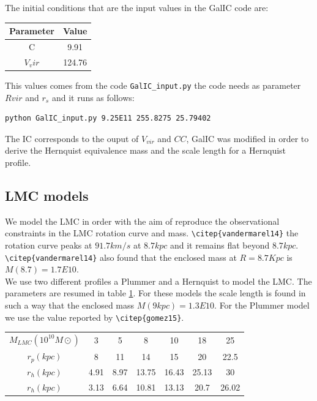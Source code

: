 The initial conditions that are the input values in the GalIC code are:

\begin{table}
\begin{tabular}{c c}
\hline
Parameter & Value \\
\hline
C & 9.91 \\
$V_vir$ & 124.76\\
\end{tabular}
\end{table}

This values comes from the code \verb+GalIC_input.py+ the code needs 
as parameter $Rvir$ and $r_s$ and it runs as follows:

\begin{verbatim}
python GalIC_input.py 9.25E11 255.8275 25.79402
\end{verbatim}

The IC corresponds to the ouput of $V_{vir}$ and $CC$, GalIC was modified 
in order to derive the Hernquist equivalence mass and the scale length for a
Hernquist profile.


\subsection{LMC models}

We model the LMC in order with the aim of reproduce the observational 
constraints in the LMC rotation curve and mass. \verb+\citep{vandermarel14}+
the rotation curve peaks at $91.7 km/s$ at $8.7 kpc$ and it remains flat 
beyond $8.7 kpc$. \verb+\citep{vandermarel14}+ also found that the enclosed
mass at $R = 8.7Kpc$ is $M(8.7) = 1.7E10$.\\

We use two different profiles a Plummer and a Hernquist to model the 
LMC. The parameters are resumed in table \ref{tab:LMC}. For these 
models the scale length is found in such a way that the enclosed 
mass  $M(9kpc) = 1.3E10$. For the Plummer model we use the value
reported by \verb+\citep{gomez15}+.



\begin{table}[H]{\label{tab:LMC}}
\begin{center}
\begin{tabular}{c c c c c c c}
\hline
\hline
$M_{LMC} (10^10M\odot)$ & 3 & 5 & 8 & 10 & 18 & 25 \\
$r_p(kpc)$ & 8 & 11 & 14 & 15 & 20 & 22.5 \\
$r_h(kpc)$ & 4.91 & 8.97 & 13.75 & 16.43 & 25.13 & 30 \\
$r_h(kpc)$ & 3.13 & 6.64 & 10.81 & 13.13 & 20.7 & 26.02 \\
\hline
\end{tabular}
\end{center}
\end{table}

